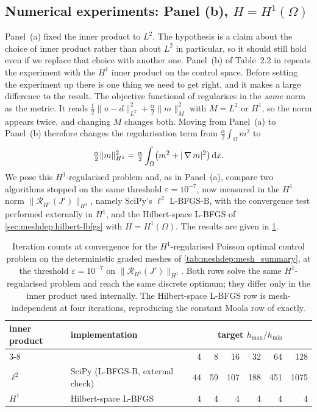 \documentclass[a4paper,11pt]{article}
\newcommand{\Om}{\Omega}
\newcommand{\dx}{\,\mathrm{d}x}
\newcommand{\Rmap}{\mathcal{R}}              %
\newcommand{\Mspace}{M}
\theoremstyle{spacedplain} \newtheorem{theorem}[counter]{Theorem} \newtheorem{lemma}[counter]{Lemma} \newtheorem{prop}[counter]{Proposition} \newtheorem{cor}[counter]{Corollary}
\theoremstyle{spaceddefinition} \newtheorem{defn}[counter]{Definition} \newtheorem{example}[counter]{Example} \newtheorem{remark}[counter]{Remark}
\begin{document}
\subsection{Numerical experiments: Panel (b), \texorpdfstring{$H = H^{1}(\Om)$}{H = H1}}
\label{sec:meshdep:panel-b}

Panel~(a) fixed the inner product to $L^{2}$. The hypothesis is a claim about the choice of inner product rather than about $L^{2}$ in particular, so it should still hold even if we replace that choice with another one. Panel~(b) of Table~2.2 in \citet{shfp2017} repeats the experiment with the $H^{1}$ inner product on the control space. Before setting the experiment up there is one thing we need to get right, and it makes a large difference to the result. The objective functional of \citet[(1.219)]{shfp2017} regularises in the \emph{same} norm as the metric. It reads $\tfrac{1}{2}\|u - d\|_{L^{2}}^{2} + \tfrac{\alpha}{2}\|m\|_{\Mspace}^{2}$ with $\Mspace = L^{2}$ or $H^{1}$, so the norm appears twice, and changing $\Mspace$ changes both. Moving from Panel~(a) to Panel~(b) therefore changes the regularisation term from $\tfrac{\alpha}{2}\int_{\Om} m^{2}$ to
\begin{equation}
  \tfrac{\alpha}{2}\|m\|_{H^{1}}^{2}
    = \tfrac{\alpha}{2}\int_{\Om}\bigl(m^{2} + |\grad m|^{2}\bigr)\dx.
\end{equation}
We pose this $H^{1}$-regularised problem and, as in Panel~(a), compare two algorithms stopped on the same threshold $\varepsilon = 10^{-7}$, now measured in the $H^{1}$ norm $\|\Rmap_{H^{1}}(J')\|_{H^{1}}$, namely SciPy's $\ell^{2}$ L-BFGS-B, with the convergence test performed externally in $H^{1}$, and the Hilbert-space L-BFGS of \cref{sec:meshdep:hilbert-lbfgs} with $H = H^{1}(\Om)$. The results are given in \cref{tab:meshdep:panel-b}.
\begin{table}[H]
  \centering
  \begin{tabular}{l l r r r r r r}
    \toprule
    inner product & implementation
       & \multicolumn{6}{c}{target $h_{\max} / h_{\min}$} \\
    \cmidrule(lr){3-8}
       &        & 4 & 8 & 16 & 32 & 64 & 128 \\
    \midrule
    $\ell^{2}$ & SciPy (L-BFGS-B, external check)
                                 & 44 & 59 & 107 & 188 & 451 & 1075 \\
    $H^{1}$    & Hilbert-space L-BFGS
                                 &  4 &  4 &   4 &   4 &   4 & 4 \\
    \bottomrule
  \end{tabular}
  \caption{Iteration counts at convergence for the $H^{1}$-regularised Poisson optimal control problem on the deterministic graded meshes of \cref{tab:meshdep:mesh_summary}, at the threshold $\varepsilon = 10^{-7}$ on $\|\Rmap_{H^{1}}(J')\|_{H^{1}}$. Both rows solve the same $H^{1}$-regularised problem and reach the same discrete optimum; they differ only in the inner product used internally. The Hilbert-space L-BFGS row is mesh-independent at four iterations, reproducing the constant Moola row of \citet[Table~2.2(b)]{shfp2017} exactly.}
  \label{tab:meshdep:panel-b}
\end{table}
\end{document}
